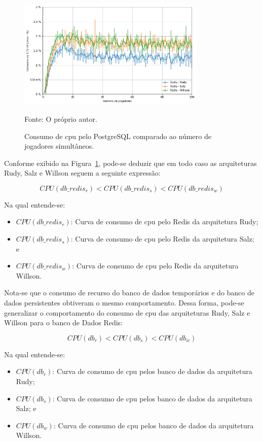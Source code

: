 \begin{figure}[htb!]
  \caption{Consumo de \ac{cpu} pelo PostgreSQL comparado ao número de jogadores simultâneos.}
  \label{fig:cpu_redis_media_por_jogador}
  \includegraphics[width=0.8\textwidth]{figuras/analise/cpu_redis_media_por_jogador.png}
  \centering

  Fonte: O próprio autor.
\end{figure}

Conforme exibido na Figura~\ref{fig:cpu_redis_media_por_jogador}, pode-se deduzir que em todo caso as arquiteturas Rudy, Salz e Willson seguem a seguinte expressão:

$$
    CPU(db\_redis_{r}) < CPU(db\_redis_{s}) < CPU(db\_redis_{w})
$$

Na qual entende-se:

\begin{itemize}
\item $CPU(db\_redis_{r})$: Curva de consumo de \ac{cpu} pelo Redis da arquitetura Rudy;
\item $CPU(db\_redis_{s})$: Curva de consumo de \ac{cpu} pelo Redis da arquitetura Salz; e
\item $CPU(db\_redis_{w})$: Curva de consumo de \ac{cpu} pelo Redis da arquitetura Willson.
\end{itemize}

Nota-se que o consumo de recurso do banco de dados temporários e do banco de dados persistentes obtiveram o mesmo comportamento.
%
Dessa forma, pode-se generalizar o comportamento do consumo de \ac{cpu} das arquiteturas Rudy, Salz e Willson para o banco de Dados Redis:

$$
    CPU(db_{r}) < CPU(db_{s}) < CPU(db_{w})
$$

Na qual entende-se:

\begin{itemize}
\item $CPU(db_{r})$: Curva de consumo de \ac{cpu} pelos banco de dados da arquitetura Rudy;
\item $CPU(db_{s})$: Curva de consumo de \ac{cpu} pelos banco de dados da arquitetura Salz; e
\item $CPU(db_{w})$: Curva de consumo de \ac{cpu} pelos banco de dados da arquitetura Willson.
\end{itemize}

